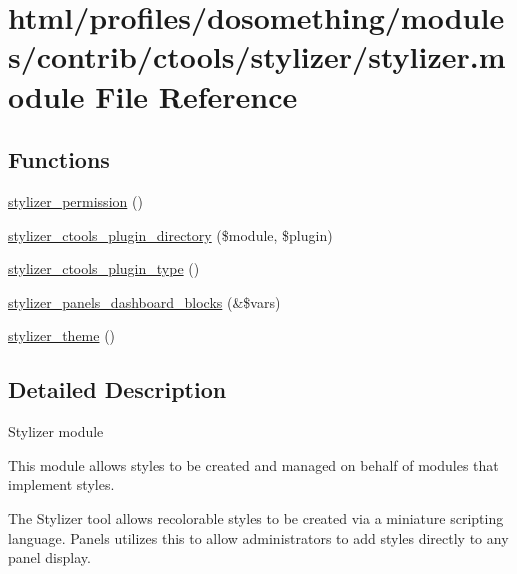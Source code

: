 \hypertarget{stylizer_8module}{
\section{html/profiles/dosomething/modules/contrib/ctools/stylizer/stylizer.module File Reference}
\label{stylizer_8module}
}
\subsection*{Functions}
\begin{DoxyCompactItemize}
\item 
\hyperlink{stylizer_8module_a9d624ecb21d6a13f01a4bb9caa98fe18}{stylizer\_\-permission} ()
\item 
\hyperlink{stylizer_8module_a306f4b0aa81215b0b630cd338f611472}{stylizer\_\-ctools\_\-plugin\_\-directory} (\$module, \$plugin)
\item 
\hyperlink{stylizer_8module_abeb96d42828cd289c995735a44425f89}{stylizer\_\-ctools\_\-plugin\_\-type} ()
\item 
\hyperlink{stylizer_8module_a21439f0e6d0635c0825dd11f815f4a30}{stylizer\_\-panels\_\-dashboard\_\-blocks} (\&\$vars)
\item 
\hyperlink{stylizer_8module_a5226a61bbe6d9de962a2f842db402993}{stylizer\_\-theme} ()
\end{DoxyCompactItemize}


\subsection{Detailed Description}
Stylizer module

This module allows styles to be created and managed on behalf of modules that implement styles.

The Stylizer tool allows recolorable styles to be created via a miniature scripting language. Panels utilizes this to allow administrators to add styles directly to any panel display. 

